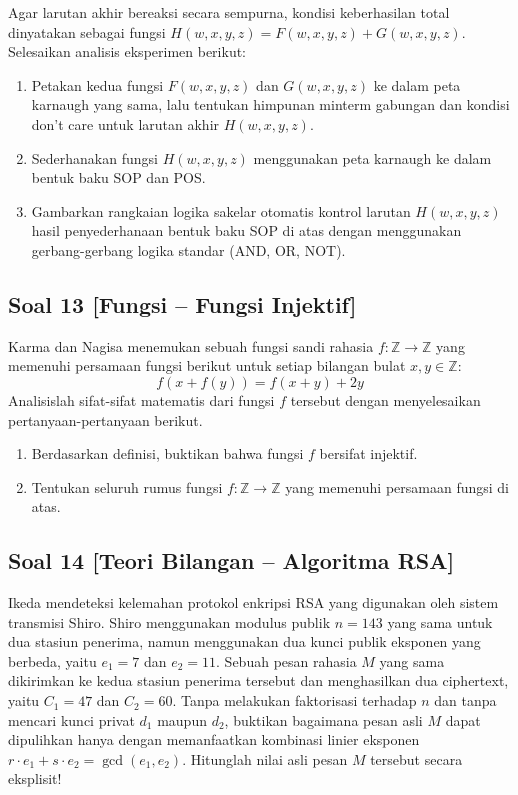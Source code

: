 \documentclass[12pt,a4paper]{article}
\begin{document}
Agar larutan akhir bereaksi secara sempurna, kondisi keberhasilan total dinyatakan sebagai fungsi $H(w,x,y,z) = F(w,x,y,z) + G(w,x,y,z)$. Selesaikan analisis eksperimen berikut:

\begin{enumerate}[label=(\alph*)]
    \item Petakan kedua fungsi $F(w,x,y,z)$ dan $G(w,x,y,z)$ ke dalam peta karnaugh yang sama, lalu tentukan himpunan minterm gabungan dan kondisi don't care untuk larutan akhir $H(w,x,y,z)$.
    \item Sederhanakan fungsi $H(w,x,y,z)$ menggunakan peta karnaugh ke dalam bentuk baku SOP dan POS.
    \item Gambarkan rangkaian logika sakelar otomatis kontrol larutan $H(w,x,y,z)$ hasil penyederhanaan bentuk baku SOP di atas dengan menggunakan gerbang-gerbang logika standar (AND, OR, NOT).
\end{enumerate}

\subsection*{Soal 13 [Fungsi -- Fungsi Injektif]}
Karma dan Nagisa menemukan sebuah fungsi sandi rahasia $f: \mathbb{Z} \to \mathbb{Z}$ yang memenuhi persamaan fungsi berikut untuk setiap bilangan bulat $x, y \in \mathbb{Z}$:
\[ f(x + f(y)) = f(x + y) + 2y \]
Analisislah sifat-sifat matematis dari fungsi $f$ tersebut dengan menyelesaikan pertanyaan-pertanyaan berikut.
\begin{enumerate}[label=(\alph*)]
    \item Berdasarkan definisi, buktikan bahwa fungsi $f$ bersifat injektif.
    \item Tentukan seluruh rumus fungsi $f: \mathbb{Z} \to \mathbb{Z}$ yang memenuhi persamaan fungsi di atas.
\end{enumerate}

\subsection*{Soal 14 [Teori Bilangan -- Algoritma RSA]}
Ikeda mendeteksi kelemahan protokol enkripsi RSA yang digunakan oleh sistem transmisi Shiro. Shiro menggunakan modulus publik $n = 143$ yang sama untuk dua stasiun penerima, namun menggunakan dua kunci publik eksponen yang berbeda, yaitu $e_1 = 7$ dan $e_2 = 11$. Sebuah pesan rahasia $M$ yang sama dikirimkan ke kedua stasiun penerima tersebut dan menghasilkan dua ciphertext, yaitu $C_1 = 47$ dan $C_2 = 60$. Tanpa melakukan faktorisasi terhadap $n$ dan tanpa mencari kunci privat $d_1$ maupun $d_2$, buktikan bagaimana pesan asli $M$ dapat dipulihkan hanya dengan memanfaatkan kombinasi linier eksponen $r \cdot e_1 + s \cdot e_2 = \gcd(e_1, e_2)$. Hitunglah nilai asli pesan $M$ tersebut secara eksplisit!
\end{document}
